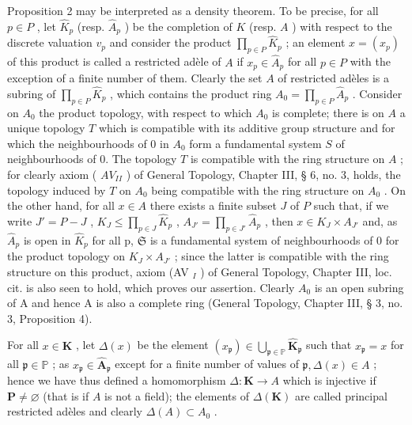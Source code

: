 Proposition 2 may be interpreted as a density theorem. To be precise, for all \(p \in P\) , let \(\hat{K}_p\) (resp. \(\hat{A}_p\) ) be the completion of \(K\) (resp. \(A\) ) with respect to the discrete valuation \(v_p\) and consider the product \(\prod_{p \in P} \hat{K}_p\) ; an element \(x = (x_p)\) of this product is called a restricted adèle of \(A\) if \(x_p \in \hat{A}_p\) for all \(p \in P\) with the exception of a finite number of them. Clearly the set \(A\) of restricted adèles is a subring of \(\prod_{p \in P} \hat{K}_p\) , which contains the product ring \(A_0 = \prod_{p \in P} \hat{A}_p\) . Consider on \(A_0\) the product topology, with respect to which \(A_0\) is complete; there is on \(A\) a unique topology \(T\) which is compatible with its additive group structure and for which the neighbourhoods of 0 in \(A_0\) form a fundamental system \(S\) of neighbourhoods of 0. The topology \(T\) is compatible with the ring structure on \(A\) ; for clearly axiom ( \(AV_{II}\) ) of General Topology, Chapter III, § 6, no. 3, holds, the topology induced by \(T\) on \(A_0\) being compatible with the ring structure on \(A_0\) . On the other hand, for all \(x \in A\) there exists a finite subset \(J\) of \(P\) such that, if we write \(J' = P - J\) , \(K_J \leqslant \prod_{p \in J} \hat{K}_p\) , \(A_{J'} = \prod_{p \in J'} \hat{A}_p\) , then \(x \in K_{J} \times A_{J'}\) and, as \(\hat{A}_{p}\) is open in \(\hat{K}_{p}\) for all p, \(\mathfrak{S}\) is a fundamental system of neighbourhoods of 0 for the product topology on \(K_{J} \times A_{J'}\) ; since the latter is compatible with the ring structure on this product, axiom (AV \(_{I}\) ) of General Topology, Chapter III, loc. cit. is also seen to hold, which proves our assertion. Clearly \(A_{0}\) is an open subring of A and hence A is also a complete ring (General Topology, Chapter III, § 3, no. 3, Proposition 4).

For all \(x \in \mathbf{K}\) , let \(\Delta(x)\) be the element \((x_{\mathfrak{p}}) \in \bigcup_{\mathfrak{p} \in \mathbb{P}} \hat{\mathbf{K}}_{\mathfrak{p}}\) such that \(x_{\mathfrak{p}} = x\) for all \(\mathfrak{p} \in \mathbb{P}\) ; as \(x_{\mathfrak{p}} \in \hat{\mathbf{A}}_{\mathfrak{p}}\) except for a finite number of values of \(\mathfrak{p}, \Delta(x) \in A\) ; hence we have thus defined a homomorphism \(\Delta: \mathbf{K} \to A\) which is injective if \(\mathbf{P} \neq \varnothing\) (that is if \(A\) is not a field); the elements of \(\Delta(\mathbf{K})\) are called principal restricted adèles and clearly \(\Delta(A) \subset A_0\) .

